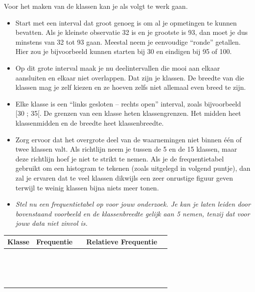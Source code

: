 \documentclass[11pt]{article}
\newcommand{\vraag}[2]{\begin{itemize}\item {\it #1} \vspace*{#2}\end{itemize}}
\begin{document}
Voor het maken van de klassen kan je als volgt te werk gaan.
\begin{itemize}
  \item Start met een interval dat groot genoeg is om al je opmetingen te kunnen bevatten. Als je
kleinste observatie 32 is en je grootste is 93, dan moet je dus minstens van 32 tot 93 gaan.
Meestal neem je eenvoudige “ronde” getallen. Hier zou je bijvoorbeeld kunnen starten bij 30
en eindigen bij 95 of 100.
  \item Op dit grote interval maak je nu deelintervallen die mooi aan elkaar aansluiten en elkaar niet
overlappen. Dat zijn je klassen. De breedte van die klassen mag je zelf kiezen en ze hoeven
zelfs niet allemaal even breed te zijn.
  \item Elke klasse is een “links gesloten – rechts open” interval, zoals bijvoorbeeld [30 ; 35[. De
grenzen van een klasse heten klassengrenzen. Het midden heet klassenmidden en de
breedte heet klassenbreedte.
  \item Zorg ervoor dat het overgrote deel van de waarnemingen niet binnen één of twee klassen
valt. Als richtlijn neem je tussen de 5 en de 15 klassen, maar deze richtlijn hoef je niet te
strikt te nemen. Als je de frequentietabel gebruikt om een histogram te tekenen (zoals
uitgelegd in volgend puntje), dan zal je ervaren dat te veel klassen dikwijls een zeer onrustige
figuur geven terwijl te weinig klassen bijna niets meer tonen.
\end{itemize}

\vraag{Stel nu een frequentietabel op voor jouw onderzoek. Je kan je laten leiden door bovenstaand
voorbeeld en de klassenbreedte gelijk aan 5 nemen, tenzij dat voor jouw data niet zinvol is.}{0cm}

\begin{center}
  \begin{tabular}{|p{2cm}|p{2cm}|p{2cm}|p{2cm}|p{2cm}|}
    \hline
    Klasse & Frequentie &&Relatieve Frequentie&\\
    \hline&&&&\\\hline&&&&\\\hline&&&&\\\hline&&&&\\\hline&&&&\\
    \hline&&&&\\\hline&&&&\\\hline&&&&\\\hline&&&&\\\hline&&&&\\
    \hline&&&&\\\hline&&&&\\\hline&&&&\\\hline&&&&\\\hline&&&&\\\hline
  \end{tabular}
\end{center}
\end{document}
